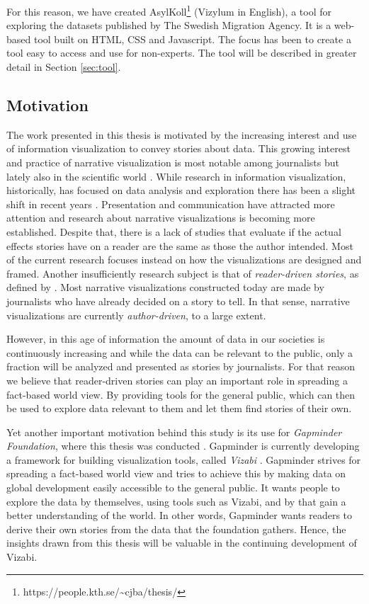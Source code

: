\documentclass{acmtog} %
\begin{document}
For this reason, we have created AsylKoll\footnote{https://people.kth.se/\textasciitilde cjba/thesis/} (Vizylum in English), a tool for exploring the datasets published by The Swedish Migration Agency. It is a web-based tool built on HTML, CSS and Javascript. The focus has been to create a tool easy to access and use for non-experts. The tool will be described in greater detail in Section \ref{sec:tool}.

\subsection{Motivation}
\label{sub:motivation}
The work presented in this thesis is motivated by the increasing interest and use of information visualization to convey stories about data. This growing interest and practice of narrative visualization is most notable among journalists but lately also in the scientific world \cite{eccles2008stories,ma2012scientific}. While research in information visualization, historically, has focused on data analysis and exploration there has been a slight shift in recent years \cite{kosara2013storytelling}. Presentation and communication have attracted more attention and research about narrative visualizations is becoming more established. Despite that, there is a lack of studies that evaluate if the actual effects stories have on a reader are the same as those the author intended. Most of the current research focuses instead on how the visualizations are designed and framed. Another insufficiently research subject is that of \emph{reader-driven stories}, as defined by \cite{segel2010narrative}. Most narrative visualizations constructed today are made by journalists who have already decided on a story to tell. In that sense, narrative visualizations are currently \emph{author-driven}, to a large extent. 

However, in this age of information the amount of data in our societies is continuously increasing and while the data can be relevant to the public, only a fraction will be analyzed and presented as stories by journalists. For that reason we believe that reader-driven stories can play an important role in spreading a fact-based world view. By providing tools for the general public, which can then be used to explore data relevant to them and let them find stories of their own.

Yet another important motivation behind this study is its use for \emph{Gapminder Foundation}, where this thesis was conducted \cite{gapminder}. Gapminder is currently developing a framework for building visualization tools, called \emph{Vizabi} \cite{vizabi}. Gapminder strives for spreading a fact-based world view and tries to achieve this by making data on global development easily accessible to the general public. It wants people to explore the data by themselves, using tools such as Vizabi, and by that gain a better understanding of the world. In other words, Gapminder wants readers to derive their own stories from the data that the foundation gathers. Hence, the insights drawn from this thesis will be valuable in the continuing development of Vizabi.
\end{document}
